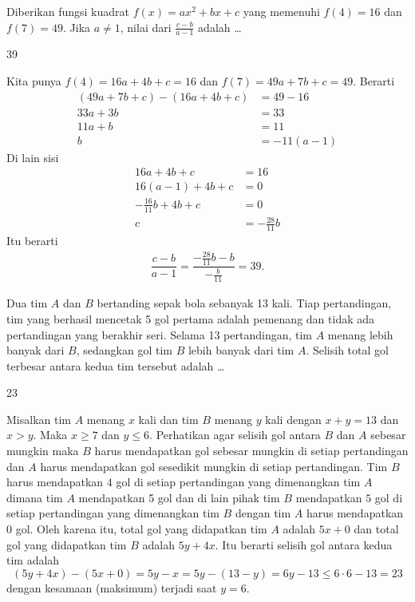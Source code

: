 \begin{soalbaru}
Diberikan fungsi kuadrat  $f(x) = ax^2+bx+c$ yang memenuhi $f(4)=16$ dan $f(7)=49$. Jika $a \neq 1$, nilai dari $\frac{c-b}{a-1}$ adalah \dots
\end{soalbaru}
\begin{jawaban}
39
\end{jawaban}
\begin{solusi}
Kita punya $f(4)=16a+4b+c=16$ dan $f(7)=49a+7b+c=49$. Berarti 
\begin{align*}
(49a+7b+c)-(16a+4b+c)&=49-16\\
33a+3b &= 33\\
11a+b &= 11\\
b &= -11(a-1)
\end{align*}
Di lain sisi
\begin{align*}
16a+4b+c&=16\\
16(a-1) + 4b + c &= 0\\
-\frac{16}{11}b + 4b + c &= 0\\
c &= -\frac{28}{11}b
\end{align*}
Itu berarti 
\begin{align*}
\dfrac{c-b}{a-1} = \dfrac{-\frac{28}{11}b-b}{-\frac{b}{11}}=\boxed{39}.
\end{align*}
\end{solusi}

\begin{soalbaru}
Dua tim $A$ dan $B$ bertanding sepak bola sebanyak 13 kali. Tiap pertandingan, tim yang berhasil mencetak 5 gol pertama adalah pemenang dan tidak ada pertandingan yang berakhir seri. Selama 13 pertandingan, tim $A$ menang lebih banyak dari $B$, sedangkan gol tim $B$ lebih banyak dari tim $A$. Selisih total gol terbesar antara kedua tim tersebut adalah \dots
\end{soalbaru}
\begin{jawaban}
23
\end{jawaban}
\begin{solusi}
Misalkan tim $A$ menang $x$ kali dan tim $B$ menang $y$ kali dengan $x+y=13$ dan $x>y$. Maka $x \ge 7$ dan $y  \le 6$. Perhatikan agar selisih gol antara $B$ dan $A$ sebesar mungkin maka $B$ harus mendapatkan gol sebesar mungkin di setiap pertandingan dan $A$ harus mendapatkan gol sesedikit mungkin di setiap pertandingan. Tim $B$ harus mendapatkan $4$ gol di setiap pertandingan yang dimenangkan tim $A$ dimana tim $A$ mendapatkan 5 gol dan di lain pihak tim $B$ mendapatkan $5$ gol di setiap pertandingan yang dimenangkan tim $B$ dengan tim $A$ harus mendapatkan $0$ gol. Oleh karena itu, total gol yang didapatkan tim $A$ adalah $5x+0$ dan total gol yang didapatkan tim $B$ adalah $5y+4x$. Itu berarti selisih gol antara kedua tim adalah
$$(5y+4x)-(5x+0) = 5y-x = 5y - (13-y) = 6y - 13 \le 6 \cdot 6 - 13 = \boxed{23}$$
dengan kesamaan (maksimum) terjadi saat $y=6$.
\end{solusi}

